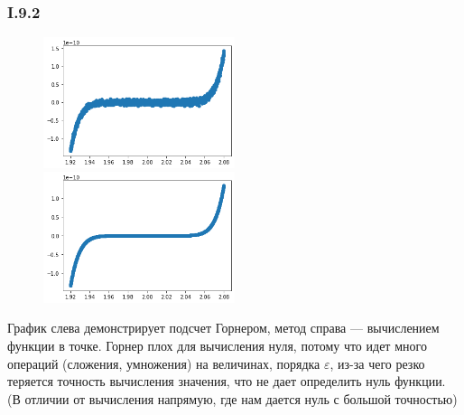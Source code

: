 \subsubsection*{I.9.2}
\begin{figure}[H]
	\includegraphics[width=0.5\textwidth]{parts/img/I_9_2_1.png}
	\includegraphics[width=0.5\textwidth]{parts/img/I_9_2_2.png}
\end{figure}
График слева демонстрирует подсчет Горнером, метод справа --- вычислением функции в точке. Горнер плох для вычисления нуля, потому что идет много операций (сложения, умножения) на величинах, порядка $\varepsilon$, из-за чего резко теряется точность вычисления значения, что не дает определить нуль функции. (В отличии от вычисления напрямую, где нам дается нуль с большой точностью)